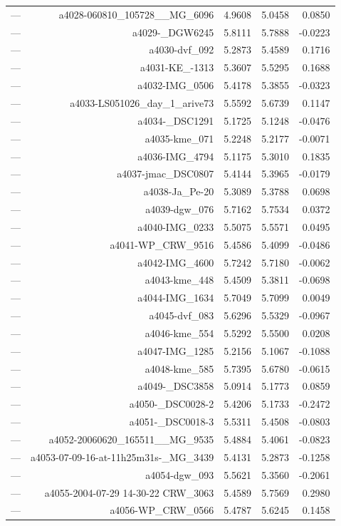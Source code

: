 \begin{table}[htbp]
\begin{tabular}{lrrrr}
— & a4028-060810_105728__MG_6096 & 4.9608 & 5.0458 & 0.0850 \\
— & a4029-_DGW6245 & 5.8111 & 5.7888 & -0.0223 \\
— & a4030-dvf_092 & 5.2873 & 5.4589 & 0.1716 \\
— & a4031-KE_-1313 & 5.3607 & 5.5295 & 0.1688 \\
— & a4032-IMG_0506 & 5.4178 & 5.3855 & -0.0323 \\
— & a4033-LS051026_day_1_arive73 & 5.5592 & 5.6739 & 0.1147 \\
— & a4034-_DSC1291 & 5.1725 & 5.1248 & -0.0476 \\
— & a4035-kme_071 & 5.2248 & 5.2177 & -0.0071 \\
— & a4036-IMG_4794 & 5.1175 & 5.3010 & 0.1835 \\
— & a4037-jmac_DSC0807 & 5.4144 & 5.3965 & -0.0179 \\
— & a4038-Ja_Pe-20 & 5.3089 & 5.3788 & 0.0698 \\
— & a4039-dgw_076 & 5.7162 & 5.7534 & 0.0372 \\
— & a4040-IMG_0233 & 5.5075 & 5.5571 & 0.0495 \\
— & a4041-WP_CRW_9516 & 5.4586 & 5.4099 & -0.0486 \\
— & a4042-IMG_4600 & 5.7242 & 5.7180 & -0.0062 \\
— & a4043-kme_448 & 5.4509 & 5.3811 & -0.0698 \\
— & a4044-IMG_1634 & 5.7049 & 5.7099 & 0.0049 \\
— & a4045-dvf_083 & 5.6296 & 5.5329 & -0.0967 \\
— & a4046-kme_554 & 5.5292 & 5.5500 & 0.0208 \\
— & a4047-IMG_1285 & 5.2156 & 5.1067 & -0.1088 \\
— & a4048-kme_585 & 5.7395 & 5.6780 & -0.0615 \\
— & a4049-_DSC3858 & 5.0914 & 5.1773 & 0.0859 \\
— & a4050-_DSC0028-2 & 5.4206 & 5.1733 & -0.2472 \\
— & a4051-_DSC0018-3 & 5.5311 & 5.4508 & -0.0803 \\
— & a4052-20060620_165511__MG_9535 & 5.4884 & 5.4061 & -0.0823 \\
— & a4053-07-09-16-at-11h25m31s-_MG_3439 & 5.4131 & 5.2873 & -0.1258 \\
— & a4054-dgw_093 & 5.5621 & 5.3560 & -0.2061 \\
— & a4055-2004-07-29 14-30-22 CRW_3063 & 5.4589 & 5.7569 & 0.2980 \\
— & a4056-WP_CRW_0566 & 5.4787 & 5.6245 & 0.1458 \\

\end{tabular}
\end{table}
